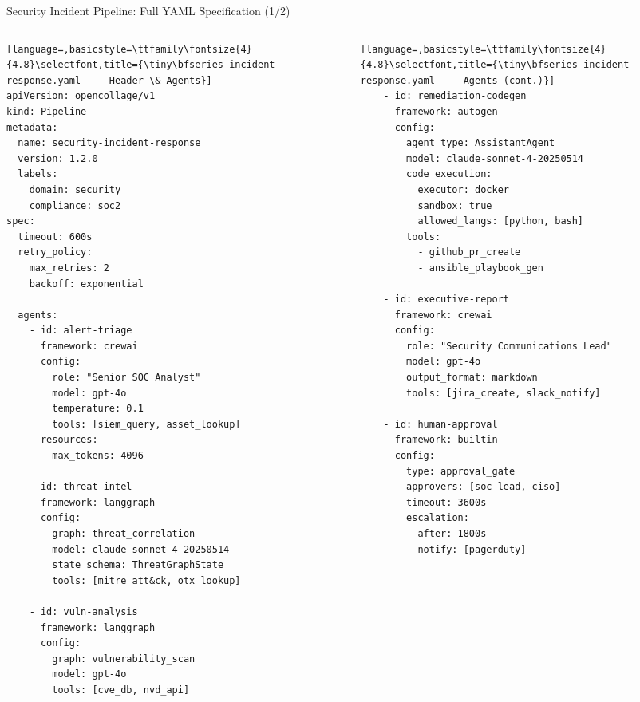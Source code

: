 \begin{frame}[fragile]{\fontsize{11}{13}\selectfont Security Incident Pipeline: Full YAML Specification (1/2)}
  \vspace{-0.4cm}
  \begin{columns}[T]
    \begin{column}{0.50\textwidth}
      \begin{lstlisting}[language=,basicstyle=\ttfamily\fontsize{4}{4.8}\selectfont,title={\tiny\bfseries incident-response.yaml --- Header \& Agents}]
apiVersion: opencollage/v1
kind: Pipeline
metadata:
  name: security-incident-response
  version: 1.2.0
  labels:
    domain: security
    compliance: soc2
spec:
  timeout: 600s
  retry_policy:
    max_retries: 2
    backoff: exponential

  agents:
    - id: alert-triage
      framework: crewai
      config:
        role: "Senior SOC Analyst"
        model: gpt-4o
        temperature: 0.1
        tools: [siem_query, asset_lookup]
      resources:
        max_tokens: 4096

    - id: threat-intel
      framework: langgraph
      config:
        graph: threat_correlation
        model: claude-sonnet-4-20250514
        state_schema: ThreatGraphState
        tools: [mitre_att&ck, otx_lookup]

    - id: vuln-analysis
      framework: langgraph
      config:
        graph: vulnerability_scan
        model: gpt-4o
        tools: [cve_db, nvd_api]
      \end{lstlisting}
    \end{column}
    \begin{column}{0.50\textwidth}
      \begin{lstlisting}[language=,basicstyle=\ttfamily\fontsize{4}{4.8}\selectfont,title={\tiny\bfseries incident-response.yaml --- Agents (cont.)}]
    - id: remediation-codegen
      framework: autogen
      config:
        agent_type: AssistantAgent
        model: claude-sonnet-4-20250514
        code_execution:
          executor: docker
          sandbox: true
          allowed_langs: [python, bash]
        tools:
          - github_pr_create
          - ansible_playbook_gen

    - id: executive-report
      framework: crewai
      config:
        role: "Security Communications Lead"
        model: gpt-4o
        output_format: markdown
        tools: [jira_create, slack_notify]

    - id: human-approval
      framework: builtin
      config:
        type: approval_gate
        approvers: [soc-lead, ciso]
        timeout: 3600s
        escalation:
          after: 1800s
          notify: [pagerduty]
      \end{lstlisting}
    \end{column}
  \end{columns}
\end{frame}

